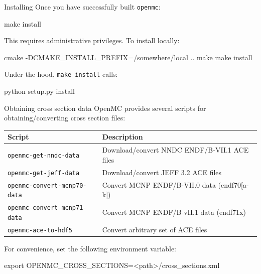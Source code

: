 \documentclass[noamssymb,svgnames]{beamer}
\begin{document}
\begin{frame}[fragile]{Installing}
  Once you have successfully built \textcolor{green!60!black}{\texttt{openmc}}:
  \begin{shell}
    make install
  \end{shell}
  This requires administrative privileges. To install locally:
  \begin{shell}
    cmake -DCMAKE_INSTALL_PREFIX=/somewhere/local ..
    make
    make install
  \end{shell}
  Under the hood, \texttt{make install} calls:
  \begin{shell}
    python setup.py install
  \end{shell}
\end{frame}

\begin{frame}[fragile]{Obtaining cross section data}
  OpenMC provides several scripts for obtaining/converting cross section files:
  \begin{table}
    \centering
    \scriptsize{
    \begin{tabular}{ll}
      \toprule
      \textbf{Script} & \textbf{Description} \\
      \midrule
      \texttt{openmc-get-nndc-data} & Download/convert NNDC ENDF/B-VII.1 ACE files \\
      \texttt{openmc-get-jeff-data} & Download/convert JEFF 3.2 ACE files \\
      \texttt{openmc-convert-mcnp70-data} & Convert MCNP ENDF/B-VII.0 data (endf70[a-k]) \\
      \texttt{openmc-convert-mcnp71-data} & Convert MCNP ENDF/B-vII.1 data (endf71x) \\
      \texttt{openmc-ace-to-hdf5} & Convert arbitrary set of ACE files \\
      \bottomrule
    \end{tabular}
    }
  \end{table}
  \vfill
  For convenience, set the following environment variable:
  \begin{shell}[minted options={fontsize=\scriptsize}]
    export OPENMC_CROSS_SECTIONS=<path>/cross_sections.xml
  \end{shell}
\end{frame}
\end{document}
